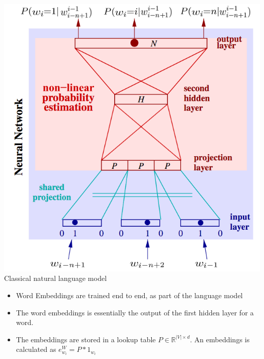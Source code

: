 \documentclass[11pt, a4paper, landscape]{article}
\begin{document}
\vfill
\begin{minipage}[b]{.4\linewidth}
  \begin{center}
    \includegraphics[width=\linewidth]{../article/img/classic_nnlm}
    Classical natural language model
  \end{center}
\end{minipage}
\begin{minipage}[b]{.6\linewidth}
  \begin{itemize}
  \item Word Embeddings are trained end to end, as part of the language model
  \item The word embeddings is essentially the output of the first hidden layer for a word.
  \item The embeddings are stored in a lookup table $P \in \mathbb{R}^{|V| \times d}$. 
      An embeddings is calculated as $e_{w_i}^W = P * 1_{w_i}$
  \end{itemize}
\end{minipage}
\vfill

\NewPage{}
\end{document}
